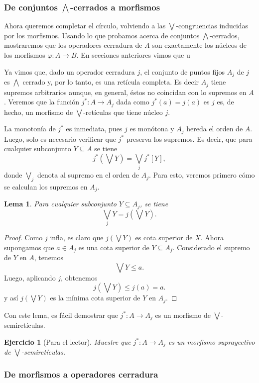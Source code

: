 \documentclass[12pt,letterpaper,titlepage]{article}
\newtheorem{exe}{Ejercicio}
\newtheorem{lemma}{Lema}
\theoremstyle{definition}
\newcommand\Sup{\bigvee}
\renewcommand\phi{\varphi}
\newcommand\Inf{\bigwedge}
\newcommand\tps[2]{\texorpdfstring{#1}{#2}}
\newcommand\<{\langle}
\renewcommand\>{\rangle}
\begin{document}
\subsubsection{De conjuntos \tps{$\Inf$}{Inf}-cerrados a morfismos}

Ahora queremos completar el círculo, volviendo a las $\Sup$-congruencias
inducidas por los morfismos.
Usando lo que probamos acerca de conjuntos $\Inf$-cerrados,
mostraremos que los operadores cerradura de $A$ son exactamente
los núcleos de los morfismos $\phi:A\to B$.
En secciones anteriores vimos que u

Ya vimos que, dado un operador cerradura $j$, el conjunto de puntos fijos $A_j$
de $j$ es $\Inf$ cerrado y, por lo tanto, es una retícula completa.
Es decir $A_j$ tiene supremos arbitrarios aunque, en general,
éstos no coincidan con lo supremos en $A$.
Veremos que la función $j^*:A\to A_j$ dada como $j^*(a) = j(a)$ es $j$
es, de hecho, un morfismo de $\Sup$-retículas que tiene núcleo $j$.

La monotonía de $j^*$ es inmediata, pues $j$ es monótona y $A_j$ hereda el
orden de $A$.
Luego, solo es necesario verificar que $j^*$ preserva los supremos.
Es decir, que para cualquier subconjunto $Y\subseteq A$ se tiene
\[
    j^*(\Sup Y) = \Sup_j j^*[Y]
,\]
donde $\Sup_j$ denota al supremo en el orden de $A_j$.
Para esto, veremos primero cómo se calculan los supremos en $A_j$.
\begin{lemma}
    Para cualquier subconjunto $Y\subseteq A_j$, se tiene
    \[
        \Sup_j Y = j(\Sup Y)
    .\]
\end{lemma}
\begin{proof}
    Como $j$ infla, es claro que $j(\Sup Y)$ es cota superior de $X$.
    Ahora supongamos que $a\in A_j$ es una cota superior de $Y\subseteq A_j$.
    Considerado el supremo de $Y$ en $A$, tenemos
    \[
        \Sup Y\leq a
    .\]
    Luego, aplicando $j$, obtenemos
    \[
        j(\Sup Y) \leq j(a) = a
    .\]
    y así $j(\Sup Y)$ es la mínima cota superior de $Y$ en $A_j$.
\end{proof}
Con este lema, es fácil demostrar que $j^*:A\to A_j$ es un morfismo de
$\Sup$-semiretículas.
\begin{exe}[Para el lector]%
    Muestre que $j^*:A\to A_j$ es un morfismo suprayectivo de $\Sup$-semiretículas.
\end{exe}

\subsubsection{De morfismos a operadores cerradura}
\end{document}
